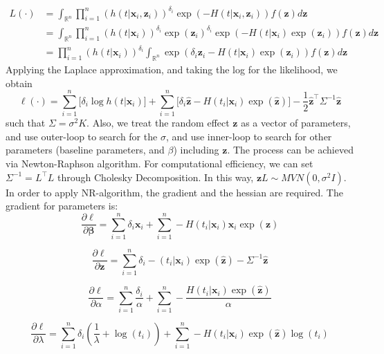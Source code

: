 \documentclass[preprint,12pt]{elsarticle}
\begin{document}
\begin{align}
    L(\cdot)&=\int_{\mathbb{R}^n}\prod_{i=1}^n(h(t|\mathbf{x}_i, \mathbf{z}_i))^{\delta_i}\exp (-H(t|\mathbf{x}_i, \mathbf{z}_i))f(\mathbf{z})d\mathbf{z}\\
    &=\int_{\mathbb{R}^n}\prod_{i=1}^n(h(t|\mathbf{x}_i))^{\delta_i}\exp(\mathbf{z}_i)^{\delta_i}\exp(-H(t|\mathbf{x}_i)\exp(\mathbf{z}_i))f(\mathbf{z})d\mathbf{z}\\
    &=\prod_{i=1}^n(h(t|\mathbf{x}_i))^{\delta_i}\int_{\mathbb{R}^n}\exp(\delta_i\mathbf{z}_i-H(t|\mathbf{x}_i)\exp(\mathbf{z}_i))f(\mathbf{z})d\mathbf{z}
\end{align}
Applying the Laplace approximation, and taking the log for the likelihood, we obtain
\begin{equation}
    \ell(\cdot)=\sum_{i=1}^n\Big [ \delta_i\log h(t|\mathbf{x}_i)\Big ] + \sum_{i=1}^n\Big [\delta_i \hat{\mathbf{z}}-H(t_i|\mathbf{x}_i)\exp(\hat{\mathbf{z}})\Big ] - \frac{1}{2}\hat{\mathbf{z}}^{\top}\Sigma^{-1}\hat{\mathbf{z}}
\end{equation}
such that $\Sigma=\sigma^2 K$. Also, we treat the random effect $\mathbf{z}$ as a vector of parameters, and use outer-loop to search for the $\sigma$, and use inner-loop to search for other parameters (baseline parameters, and $\beta$) including $\mathbf{z}$. The process can be achieved via Newton-Raphson algorithm. For computational efficiency, we can set $\Sigma^{-1}=L^{\top}L$ through Cholesky Decomposition. In this way, 
$\mathbf{z}L\sim MVN(0,\sigma^2 I)$. In order to apply NR-algorithm, the gradient and the hessian are required. The gradient for parameters is:
\begin{equation}
    \frac{\partial\ell}{\partial\boldsymbol{\beta}}=\sum_{i=1}^n\delta_i\mathbf{x}_i+\sum_{i=1}^n-H(t_i|\mathbf{x}_i)\mathbf{x}_i\exp(\mathbf{z})
\end{equation}

\begin{equation}
    \frac{\partial\ell}{\partial\mathbf{z}}=\sum_{i=1}^n\delta_i-(t_i|\mathbf{x}_i)\exp(\hat{\mathbf{z}})-\Sigma^{-1}\hat{\mathbf{z}}
\end{equation}

\begin{equation}
    \frac{\partial\ell}{\partial\alpha}=\sum_{i=1}^n\frac{\delta_i}{\alpha} + \sum_{i=1}^n-\frac{H(t_i|\mathbf{x}_i)\exp(\hat{\mathbf{z}})}{\alpha}
\end{equation}

\begin{equation}
    \frac{\partial\ell}{\partial\lambda}=\sum_{i=1}^n\delta_i(\frac{1}{\lambda}+\log (t_i))+\sum_{i=1}^n-H(t_i|\mathbf{x}_i)\exp(\hat{\mathbf{z}})\log (t_i)
\end{equation}
\end{document}
